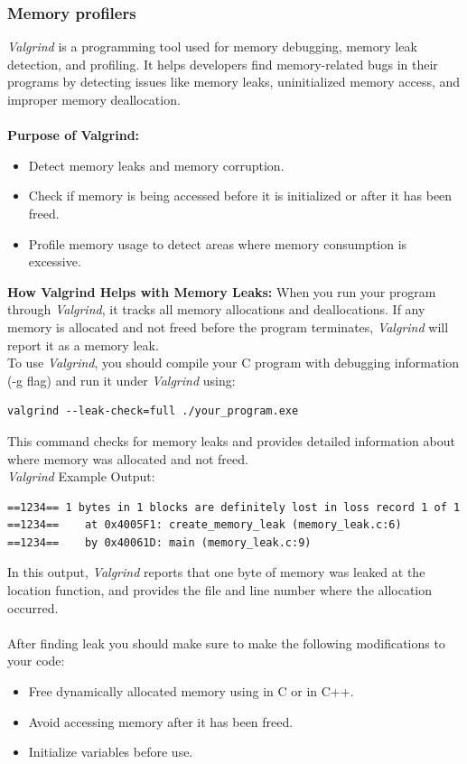 \documentclass[titlepage]{article}
\begin{document}
\subsubsection{Memory profilers}
\textit{Valgrind} is a programming tool used for memory debugging, memory leak detection, and profiling. It helps developers find memory-related bugs in their programs by detecting issues like memory leaks, uninitialized memory access, and improper memory deallocation.
\\\\\textbf{Purpose of Valgrind:}
\begin{itemize}
\item Detect memory leaks and memory corruption.
\item Check if memory is being accessed before it is initialized or after it has been freed.
\item Profile memory usage to detect areas where memory consumption is excessive.
\end{itemize}
\textbf{How Valgrind Helps with Memory Leaks:}
When you run your program through \textit{Valgrind}, it tracks all memory allocations and deallocations. If any memory is allocated and not freed before the program terminates, \textit{Valgrind} will report it as a memory leak.
\\To use \textit{Valgrind}, you should compile your C program with debugging information (-g flag) and run it under \textit{Valgrind} using:
\begin{adjustwidth}{1cm}{1cm}
\begin{tcolorbox}[codebox]
\begin{lstlisting}[numbers=none]  
valgrind --leak-check=full ./your_program.exe
\end{lstlisting}
\end{tcolorbox}
\end{adjustwidth}
This command checks for memory leaks and provides detailed information about where memory was allocated and not freed.
\\\textit{Valgrind} Example Output:
\begin{tcolorbox}[codebox]
\begin{lstlisting}
==1234== 1 bytes in 1 blocks are definitely lost in loss record 1 of 1
==1234==    at 0x4005F1: create_memory_leak (memory_leak.c:6)
==1234==    by 0x40061D: main (memory_leak.c:9)
\end{lstlisting}
\end{tcolorbox}
\noindent In this output, \textit{Valgrind} reports that one byte of memory was leaked at the location  function, and provides the file and line number where the allocation occurred.
\\\\After finding leak you should make sure to make the following modifications to your code:
\begin{itemize}
\item Free dynamically allocated memory using  in C or  in C++.
\item Avoid accessing memory after it has been freed.
\item Initialize variables before use.
\end{itemize}
\end{document}
